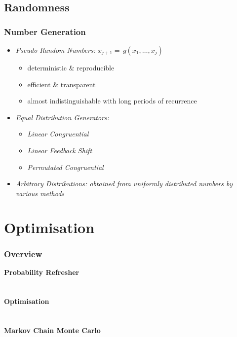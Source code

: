 	\subsection{Randomness}

	\begin{frame}
		\frametitle{Number Generation}
		\begin{itemize}
			\item<2-> \itshape{Pseudo Random Numbers:} $x_{j+1} = \,g(x_1,\ldots,x_j)$
			\begin{itemize}
				\item<3-> deterministic \& reproducible
				\item<4-> efficient \& transparent
				\item<5-> almost indistinguishable with long periods of recurrence
			\end{itemize}
			\item<6-> \itshape{Equal Distribution Generators:}
			\begin{itemize}
				\item<7-> \itshape{Linear Congruential}
				\item<8-> \itshape{Linear Feedback Shift}
				\item<9-> \itshape{Permutated Congruential}
			\end{itemize}
			\item<10-> \itshape{Arbitrary Distributions:} obtained from uniformly distributed numbers by various methods
		\end{itemize}
	\end{frame}

	\section{Optimisation}

	\begin{frame}
		\frametitle{Overview}
		\bfseries{Probability Refresher}\\[1.5pt]
		\hspace*{3ex}\\
		\hspace*{3ex}\\[3.0pt]
		\bfseries{Optimisation}\\[1.5pt]
		\hspace*{3ex}\\
		\hspace*{3ex}\\[3.0pt]
		\bfseries{Markov Chain Monte Carlo}\\[1.5pt]
		\hspace*{3ex}\\
		\hspace*{3ex}\\
		\hspace*{3ex}\\[3.0pt]
	\end{frame}

